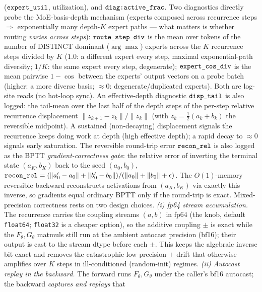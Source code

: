 \documentclass[11pt]{article}
\newcommand{\code}[1]{\texttt{#1}}
\begin{document}
(\(\code{\detokenize{expert_util}}\), utilization), and \(\code{\detokenize{diag:active_frac}}\).
Two diagnostics directly probe the MoE-basis-depth mechanism (experts composed across recurrence steps
\(\Rightarrow\) exponentially many depth-\(K\) expert paths --- what matters is whether routing
\emph{varies across steps}):  \(\code{\detokenize{route_step_div}}\) is the mean over tokens of the
number of DISTINCT dominant (\(\arg\max\)) experts across the \(K\) recurrence steps divided by \(K\)
(\(1.0\): a different expert every step, maximal exponential-path diversity; \(1/K\): the same expert
every step, degenerate);  \(\code{\detokenize{expert_cos_div}}\) is the mean pairwise \(1-\cos\) between
the experts' output vectors on a probe batch (higher: a more diverse basis; \(\approx0\):
degenerate/duplicated experts).  Both are log-site reads (no hot-loop sync).
An effective-depth diagnostic \(\code{\detokenize{disp_tail}}\) is also logged: the tail-mean over the
last half of the depth steps of the per-step relative recurrence displacement
\(\lVert z_{k+1}-z_k\rVert/\lVert z_k\rVert\) (with \(z_k=\tfrac12(a_k+b_k)\) the reversible midpoint).
A sustained (non-decaying) displacement signals the recurrence keeps doing work at depth (high
effective depth); a rapid decay to \(\approx0\) signals early saturation.
The reversible round-trip error \(\code{\detokenize{recon_rel}}\) is also logged as the BPTT
\emph{gradient-correctness gate}: the relative error of inverting the terminal state
\((a_K,b_K)\) back to the seed \((a_0,b_0)\),
\(\code{\detokenize{recon_rel}}=(\lVert a_0'-a_0\rVert+\lVert b_0'-b_0\rVert)/(\lVert a_0\rVert+\lVert b_0\rVert+\epsilon)\).
The \(O(1)\)-memory reversible backward reconstructs activations from \((a_K,b_K)\) via exactly this
inverse, so gradients equal ordinary BPTT only if the round-trip is exact.  Mixed-precision
correctness rests on two design choices.  \emph{(i) fp64 stream accumulation.}  The recurrence carries
the coupling streams \((a,b)\) in fp64 (the \code{} knob, default
\code{float64}; \code{float32} is a cheaper option), so the additive coupling \(\pm\) is exact while
the \(F_\theta,G_\theta\) matmuls still run at the ambient autocast precision (bf16); their output is
cast to the stream dtype before each \(\pm\).  This keeps the algebraic inverse bit-exact and removes
the catastrophic low-precision \(\pm\) drift that otherwise amplifies over \(K\) steps in
ill-conditioned (random-init) regimes.  \emph{(ii) Autocast replay in the backward.}  The forward runs
\(F_\theta,G_\theta\) under the caller's bf16 autocast; the backward \emph{captures and replays} that
\end{document}
